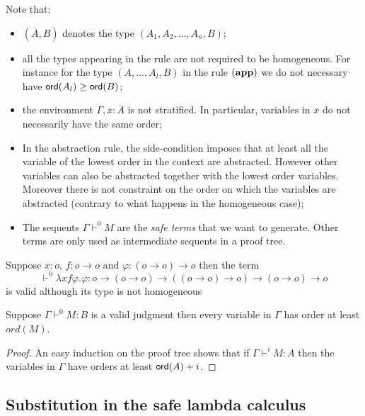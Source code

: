 Note that:
\begin{itemize}
\item $(\overline{A},B)$ denotes the type $(A_1,A_2, \ldots, A_n, B)$;
\item all the types appearing in the rule are not required to be homogeneous. For instance
for the type $(A,\ldots,A_l,B)$ in the rule $\mathbf{(app)}$ we do
not necessary have ${\sf ord}(A_l) \geq {\sf ord}(B)$;
\item the environment $\Gamma, \overline{x}:\overline{A}$ is not stratified. In particular, variables in $\overline{x}$ do not necessarily have the same order;

\item In the abstraction rule, the side-condition imposes that at least all the variable of the lowest order
in the context are abstracted. However other variables can also be
abstracted together with the lowest order variables. Moreover there
is not constraint on the order on which the variables are abstracted
(contrary to what happens in the homogeneous case);
\item The sequents $\Gamma \vdash^0 M$ are the \emph{safe terms} that we want to generate.
Other terms are only used as intermediate sequents in a proof tree.
\end{itemize}

\begin{exmp}
Suppose $x:o$, $f:o\rightarrow o$ and $\varphi:(o\rightarrow
o)\rightarrow o$ then the term $$\vdash^0 \lambda x f \varphi .
\varphi : o \rightarrow (o\rightarrow o) \rightarrow ((o\rightarrow
o)\rightarrow o) \rightarrow (o\rightarrow o)\rightarrow o$$ is
valid although its type is not homogeneous
\end{exmp}


\begin{lem}
\label{lem:nonhomosafe_basic_prop} Suppose $\Gamma \vdash^0 M : B$
is a valid judgment then every variable in $\Gamma$ has order at
least $ord(M)$.
\end{lem}
\begin{proof}
An easy induction on the proof tree shows that if $\Gamma \vdash^{i}
M : A$ then the variables in $\Gamma$ have orders at least
${\sf ord}(A)+i$.
\end{proof}

\subsection{Substitution in the safe lambda calculus}

